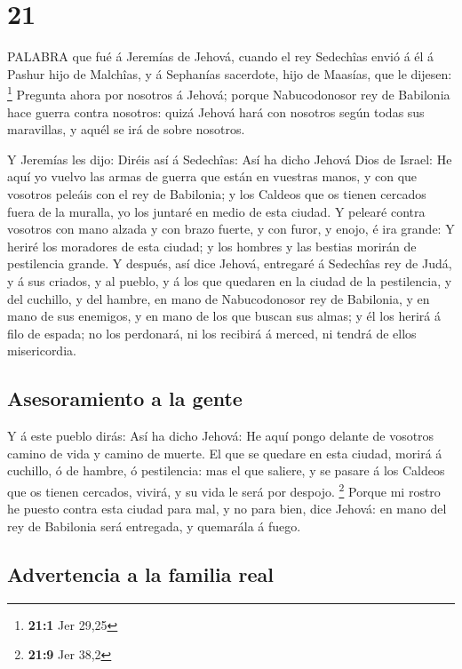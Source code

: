 \hypertarget{section-20}{%
\section{21}\label{section-20}}

 PALABRA que fué á Jeremías de Jehová, cuando el rey
Sedechîas envió á él á Pashur hijo de Malchîas, y á Sephanías sacerdote,
hijo de Maasías, que le dijesen: \footnote{\textbf{21:1} Jer 29,25}
 Pregunta ahora por nosotros á Jehová; porque Nabucodonosor
rey de Babilonia hace guerra contra nosotros: quizá Jehová hará con
nosotros según todas sus maravillas, y aquél se irá de sobre nosotros.

 Y Jeremías les dijo: Diréis así á Sedechîas: 
Así ha dicho Jehová Dios de Israel: He aquí yo vuelvo las armas de
guerra que están en vuestras manos, y con que vosotros peleáis con el
rey de Babilonia; y los Caldeos que os tienen cercados fuera de la
muralla, yo los juntaré en medio de esta ciudad.  Y pelearé
contra vosotros con mano alzada y con brazo fuerte, y con furor, y
enojo, é ira grande:  Y heriré los moradores de esta ciudad;
y los hombres y las bestias morirán de pestilencia grande. 
Y después, así dice Jehová, entregaré á Sedechîas rey de Judá, y á sus
criados, y al pueblo, y á los que quedaren en la ciudad de la
pestilencia, y del cuchillo, y del hambre, en mano de Nabucodonosor rey
de Babilonia, y en mano de sus enemigos, y en mano de los que buscan sus
almas; y él los herirá á filo de espada; no los perdonará, ni los
recibirá á merced, ni tendrá de ellos misericordia.

\hypertarget{asesoramiento-a-la-gente}{%
\subsection{Asesoramiento a la gente}\label{asesoramiento-a-la-gente}}

 Y á este pueblo dirás: Así ha dicho Jehová: He aquí pongo
delante de vosotros camino de vida y camino de muerte.  El
que se quedare en esta ciudad, morirá á cuchillo, ó de hambre, ó
pestilencia: mas el que saliere, y se pasare á los Caldeos que os tienen
cercados, vivirá, y su vida le será por despojo. \footnote{\textbf{21:9}
  Jer 38,2}  Porque mi rostro he puesto contra esta ciudad
para mal, y no para bien, dice Jehová: en mano del rey de Babilonia será
entregada, y quemarála á fuego.

\hypertarget{advertencia-a-la-familia-real}{%
\subsection{Advertencia a la familia
real}\label{advertencia-a-la-familia-real}}

